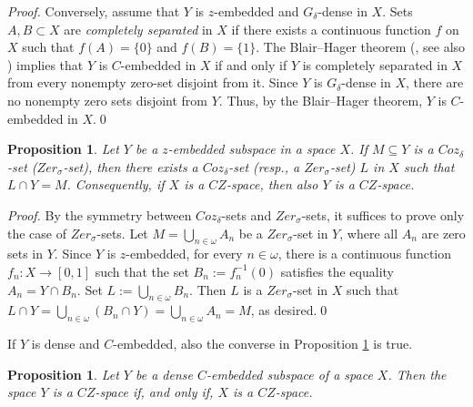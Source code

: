 \documentclass[preprint,11pt]{elsarticle}
\newtheorem{proposition}[theorem]{Proposition}
\numberwithin{equation}{section}
\numberwithin{theorem}{section}
\newcommand{\w}{\omega}
\begin{document}
\begin{proof}
Conversely, assume that $Y$ is $z$-embedded and $G_\delta$-dense in $X$. Sets $A,B\subset X$ are {\em completely separated} in $X$ if there exists a continuous function $f$ on $X$ such that $f(A)=\{0\}$ and $f(B)=\{1\}$. The Blair--Hager theorem (\cite[Corollary 3.6.B]{Bl-H}, see also \cite[Theorem 9.9.36]{ArT}) implies that $Y$ is $C$-embedded in $X$ if and only if $Y$ is completely separated in $X$ from every nonempty zero-set disjoint from it. Since $Y$ is $G_\delta$-dense in $X$, there are no nonempty zero sets disjoint from $Y$. Thus, by the Blair--Hager theorem, $Y$ is $C$-embedded in $X$.\qed
\end{proof}

\begin{proposition}\label{p:zem}
Let $Y$ be a $z$-embedded  subspace  in a space $X$. If $M\subseteq Y$  is a $Coz_{\delta}$-set {\rm(}$Zer_{\sigma}$-set{\rm)}, then there exists a $Coz_{\delta}$-set {\rm(}resp., a $Zer_{\sigma}$-set{\rm)} $L$ in $X$ such that $L \cap Y = M$. Consequently, if $X$ is a $CZ$-space, then also $Y$ is a $CZ$-space.
\end{proposition}

\begin{proof}
By the symmetry between $Coz_{\delta}$-sets and $Zer_{\sigma}$-sets, it suffices to prove only the case of $Zer_{\sigma}$-sets. Let $M=\bigcup_{n\in\w} A_n$ be a $Zer_{\sigma}$-set in $Y$, where all $A_n$ are zero sets in $Y$. Since $Y$ is $z$-embedded, for every $n\in\w$, there is a continuous function $f_n:X\to[0,1]$ such that the set $B_n:=f_n^{-1}(0)$ satisfies the equality $A_n=Y\cap B_n$. Set $L:=\bigcup_{n\in\w} B_n$. Then $L$ is a $Zer_{\sigma}$-set in $X$ such that $L\cap Y=\bigcup_{n\in\w} (B_n\cap Y)=\bigcup_{n\in\w} A_n=M$, as desired.\qed
\end{proof}

If $Y$ is dense and $C$-embedded, also the converse in Proposition \ref{p:zem} is true.

\begin{proposition} \label{l:zcembed}
Let  $Y$ be a dense $C$-embedded subspace of a space $X$. Then the space $Y$ is a $CZ$-space if, and only if, $X$ is a $CZ$-space.
\end{proposition}
\end{document}
